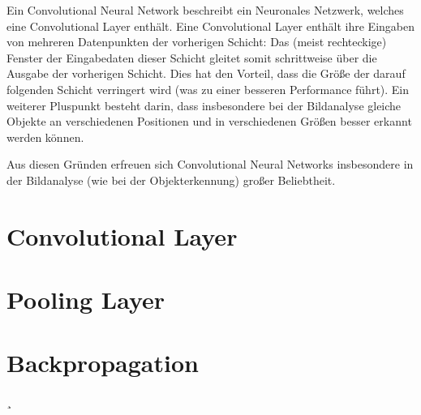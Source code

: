 Ein Convolutional Neural Network beschreibt ein Neuronales Netzwerk, welches eine Convolutional Layer enthält. Eine Convolutional Layer enthält ihre Eingaben von mehreren Datenpunkten der vorherigen Schicht: Das (meist rechteckige) Fenster der Eingabedaten dieser Schicht gleitet somit schrittweise über die Ausgabe der vorherigen Schicht. \cite{schmidhuber_15} Dies hat den Vorteil, dass die Größe der darauf folgenden Schicht verringert wird (was zu einer besseren Performance führt). Ein weiterer Pluspunkt besteht darin, dass insbesondere bei der Bildanalyse gleiche Objekte an verschiedenen Positionen und in verschiedenen Größen besser erkannt werden können. \cite{szegedy_15}

Aus diesen Gründen erfreuen sich Convolutional Neural Networks insbesondere in der Bildanalyse (wie \zB bei der Objekterkennung) großer Beliebtheit.

\section{Convolutional Layer}
\label{sec:conv}

\section{Pooling Layer}
\label{sec:pooling}

\section{Backpropagation}
\label{sec:backpropagation}¸